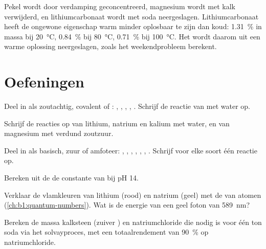 Pekel wordt door verdamping geconcentreerd, magnesium wordt met kalk
verwijderd, en lithiumcarbonaat wordt met soda neergeslagen.
Lithiumcarbonaat heeft de ongewone eigenschap warm minder oplosbaar te
zijn dan koud: \qty{1.31}{\percent} in massa bij \qty{20}{\celsius},
\qty{0.84}{\percent} bij \qty{80}{\celsius}, \qty{0.71}{\percent} bij
\qty{100}{\celsius}. Het wordt daarom uit een warme oplossing neergeslagen,
zoals het weekendprobleem berekent.

\section{Oefeningen}

\begin{exercise}[$\star$]\label{exo:b1:s-block:1}
Deel in als zoutachtig, covalent of : ,
, , , . Schrijf de reactie van
 met water op.
\end{exercise}

\begin{exercise}[$\star$]\label{exo:b1:s-block:2}
Schrijf de reacties op van lithium, natrium en kalium met water, en van
magnesium met verdund zoutzuur.
\end{exercise}

\begin{exercise}[$\star$]\label{exo:b1:s-block:3}
Deel in als basisch, zuur of amfoteer: , , ,
, , , . Schrijf voor elke soort één
reactie op.
\end{exercise}

\begin{exercise}[$\star$]\label{exo:b1:s-block:4}
Bereken uit de  de constante van
 bij pH 14.
\end{exercise}

\begin{exercise}[$\star\star$]\label{exo:b1:s-block:5}
Verklaar de vlamkleuren van lithium (rood) en natrium (geel) met de
 van atomen (\cref{ch:b1:quantum-numbers}). Wat is de
energie van een geel foton van \qty{589}{nm}?
\end{exercise}

\begin{exercise}[$\star\star$]\label{exo:b1:s-block:6}
Bereken de massa kalksteen (zuiver ) en natriumchloride die
nodig is voor één ton soda via het solvayproces, met een totaalrendement
van \qty{90}{\percent} op natriumchloride.
\end{exercise}

